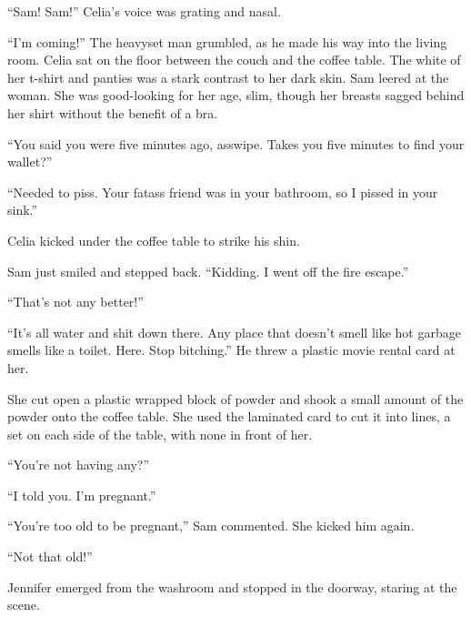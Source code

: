 





``Sam!  Sam!''  Celia's voice was grating and nasal.



``I'm coming!''  The heavyset man grumbled, as he made his way into the living room.  Celia sat on the floor between the couch and the coffee table.  The white of her t-shirt and panties was a stark contrast to her dark skin.  Sam leered at the woman.  She was good-looking for her age, slim, though her breasts sagged behind her shirt without the benefit of a bra.



``You said you were five minutes ago, asswipe.  Takes you five minutes to find your wallet?''



``Needed to piss.  Your fatass friend was in your bathroom, so I pissed in your sink.''



Celia kicked under the coffee table to strike his shin.



Sam just smiled and stepped back.  ``Kidding.  I went off the fire escape.''



``That's not any better!''



``It's all water and shit down there.  Any place that doesn't smell like hot garbage smells like a toilet.  Here.  Stop bitching.''  He threw a plastic movie rental card at her.



She cut open a plastic wrapped block of powder and shook a small amount of the powder onto the coffee table.  She used the laminated card to cut it into lines, a set on each side of the table, with none in front of her.



``You're not having any?''



``I told you.  I'm pregnant.''



``You're too old to be pregnant,'' Sam commented.  She kicked him again.



``Not that old!''



Jennifer emerged from the washroom and stopped in the doorway, staring at the scene.



